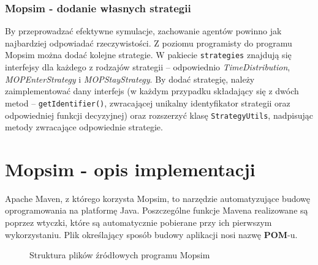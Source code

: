 \subsubsection{Mopsim - dodanie własnych strategii}
By przeprowadzać efektywne symulacje, zachowanie agentów powinno jak najbardziej odpowiadać rzeczywistości. Z poziomu programisty do programu Mopsim można dodać kolejne strategie. W pakiecie \texttt{strategies} znajdują się interfejsy dla każdego z rodzajów strategii -- odpowiednio \textit{TimeDistribution}, \textit{MOPEnterStrategy} i \textit{MOPStayStrategy}. By dodać strategię, należy zaimplementować dany interfejs (w każdym przypadku składający się z dwóch metod -- \texttt{getIdentifier()}, zwracającej unikalny identyfikator strategii oraz odpowiedniej funkcji decyzyjnej) oraz rozszerzyć klasę \texttt{StrategyUtils}, nadpisując metody zwracające odpowiednie strategie.

\section{Mopsim - opis implementacji}
Apache Maven, z którego korzysta Mopsim, to narzędzie automatyzujące budowę oprogramowania na platformę Java. Poszczególne funkcje Mavena realizowane są poprzez wtyczki, które są automatycznie pobierane przy ich pierwszym wykorzystaniu. Plik określający sposób budowy aplikacji nosi nazwę \textbf{POM}-u.

\begin{figure}[!htb]
\caption{Struktura plików źródłowych programu Mopsim}
\label{mopsim_structure}
\end{figure}
